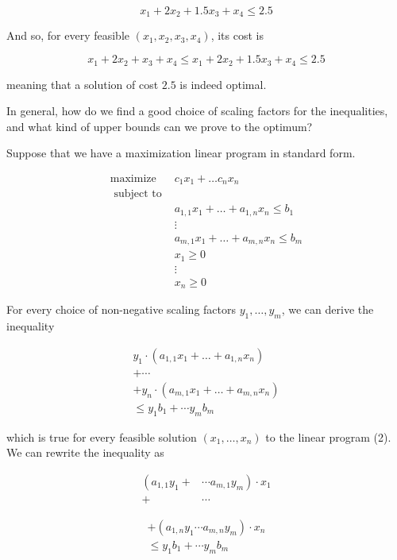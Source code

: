 \documentclass[letter,12pt]{book}
\renewcommand{\0}{\mathbf{0}}
\begin{document}
$$
x_{1}+2 x_{2}+1.5 x_{3}+x_{4} \leq 2.5
$$

And so, for every feasible $\left(x_{1}, x_{2}, x_{3}, x_{4}\right)$, its cost is

$$
x_{1}+2 x_{2}+x_{3}+x_{4} \leq x_{1}+2 x_{2}+1.5 x_{3}+x_{4} \leq 2.5
$$

meaning that a solution of cost $2.5$ is indeed optimal.

In general, how do we find a good choice of scaling factors for the inequalities, and what kind of upper bounds can we prove to the optimum?

Suppose that we have a maximization linear program in standard form.

$$
\begin{array}{ll}
\operatorname{maximize} & c_{1} x_{1}+\ldots c_{n} x_{n} \\
\text { subject to } & \\
& a_{1,1} x_{1}+\ldots+a_{1, n} x_{n} \leq b_{1} \\
& \vdots \\
& a_{m, 1} x_{1}+\ldots+a_{m, n} x_{n} \leq b_{m} \\
& x_{1} \geq 0 \\
& \vdots \\
& x_{n} \geq 0
\end{array}
$$

For every choice of non-negative scaling factors $y_{1}, \ldots, y_{m}$, we can derive the inequality

$$
\begin{gathered}
y_{1} \cdot\left(a_{1,1} x_{1}+\ldots+a_{1, n} x_{n}\right) \\
+\cdots \\
+y_{n} \cdot\left(a_{m, 1} x_{1}+\ldots+a_{m, n} x_{n}\right) \\
\leq y_{1} b_{1}+\cdots y_{m} b_{m}
\end{gathered}
$$

which is true for every feasible solution $\left(x_{1}, \ldots, x_{n}\right)$ to the linear program (2). We can rewrite the inequality as

$$
\begin{aligned}
\left(a_{1,1} y_{1}+\right.&\left.\cdots a_{m, 1} y_{m}\right) \cdot x_{1} \\
+& \cdots
\end{aligned}
$$



$$
\begin{gathered}
+\left(a_{1, n} y_{1} \cdots a_{m, n} y_{m}\right) \cdot x_{n} \\
\leq y_{1} b_{1}+\cdots y_{m} b_{m}
\end{gathered}
$$
\end{document}
